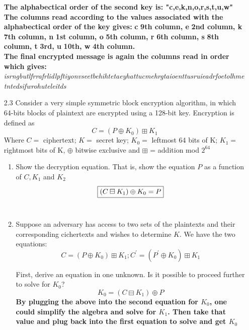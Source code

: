 \documentclass[12pt]{article}
\begin{document}
\begin{enumerate}
  \textbf{The alphabectical order of the second key is: "c,e,k,n,o,r,s,t,u,w"} \\
  \textbf{The columns read according to the values associated with the alphabectical order of the key gives: }
  \textbf{c} \rightarrow \textbf{9th column, e} \rightarrow \textbf{2nd column, k}  \rightarrow \textbf{7th column, n}  \rightarrow \textbf{1st column, o}  \rightarrow \textbf{5th column, r}  \rightarrow \textbf{6th column, s}  \rightarrow \textbf{8th column, t}  \rightarrow \textbf{3rd, u}  \rightarrow \textbf{10th, w}  \rightarrow \textbf{4th column.} \\
  \textbf{The final encrypted message is again the columns read in order which gives: } \\
  \textit{isrngbutlfrrafrlidlpftiyonvseetbehihtetaeyhattucmehrgtaioenttusruieadrfoetolhmetntedsifwrohuteleitds}

\vspace{20pt}

\item [2.3] {Consider a very simple symmetric block encryption algorithm, in which 64-bits blocks of plaintext are encrypted using a 128-bit key. Encryption is defined as} \\
$$C = (P \oplus K_{0}) \boxplus K_{1}$$
Where $C =$ ciphertext; $K = $ secret key; $K_{0} = $ leftmost 64 bits of K; $K_{1} =$ rightmost bits of K, $\oplus$ bitwise exclusive and $\boxplus$ = addition mod $2^{64}$
\begin{enumerate}
  \item Show the decryption equation. That is, show the equation $P$ as a function of $C, K_{1}$ and $K_{2}$ \\
  $$\boxed{$$(C \boxminus K_{1}) \oplus K_{0} = P$$}$$ \\

  \item Suppose an adversary has access to two sets of the plaintexts and their corresponding cichertexts and wishes to determine $K$. We have the two equations: \\
  $$C = (P \oplus K_{0}) \boxplus K_{1}; C^{'} = (P^{'} \oplus K_{0}) \boxplus K_{1}$$

  First, derive an equation in one unknown. Is it possible to proceed further to solve for $K_{0}$? \\
  $$K_{0} = (C \boxminus K_{1}) \oplus P $$
  \textbf{By plugging the above into the second equation for $K_{0}$, one could simplify the algebra and solve for $K_{1}$. Then take that value and plug back into the first equation to solve and get $K_{0}$}
\end{enumerate}
  \end{enumerate}
\end{document}
